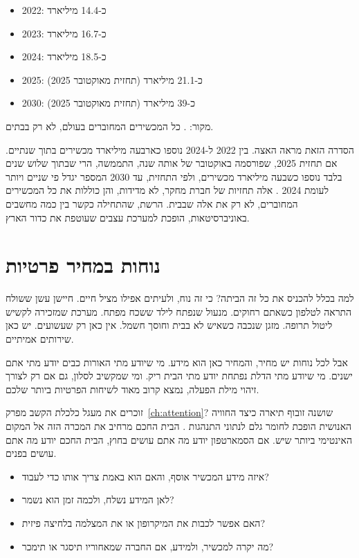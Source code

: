 \begin{factbox}
\begin{itemize}
  \item 2022: כ-14.4 מיליארד
  \item 2023: כ-16.7 מיליארד
  \item 2024: כ-18.5 מיליארד
  \item 2025: כ-21.1 מיליארד (תחזית מאוקטובר \num{2025})
  \item 2030: כ-39 מיליארד (תחזית מאוקטובר \num{2025})
\end{itemize}
מקור: \textcite{iotanalytics2025}. כל המכשירים המחוברים בעולם, לא רק בבתים.
\end{factbox}

הסדרה הזאת מראה האצה. בין 2022 ל-2024 נוספו כארבעה מיליארד מכשירים בתוך שנתיים. אם תחזית \num{2025}, שפורסמה באוקטובר של אותה שנה, התממשה, הרי שבתוך שלוש שנים בלבד נוספו כשבעה מיליארד מכשירים, ולפי התחזית, עד 2030 המספר יגדל פי שניים ויותר לעומת 2024 \parencite{iotanalytics2025}. אלה תחזיות של חברת מחקר, לא מדידות, והן כוללות את כל המכשירים המחוברים, לא רק את אלה שבבית. הרשת, שהתחילה כקשר בין כמה מחשבים באוניברסיטאות, הופכת למערכת עצבים שעוטפת את כדור הארץ.

\section{נוחות במחיר פרטיות}

למה בכלל להכניס את כל זה הביתה? כי זה נוח, ולעיתים אפילו מציל חיים. חיישן עשן ששולח התראה לטלפון כשאתם רחוקים. מנעול שנפתח לילד ששכח מפתח. מערכת שמזכירה לקשיש ליטול תרופה. מזגן שנכבה כשאיש לא בבית וחוסך חשמל. אין כאן רק שעשועים. יש כאן שירותים אמיתיים.

אבל לכל נוחות יש מחיר, והמחיר כאן הוא מידע. מי שיודע מתי האורות כבים יודע מתי אתם ישנים. מי שיודע מתי הדלת נפתחת יודע מתי הבית ריק. ומי שמקשיב לסלון, גם אם רק לצורך זיהוי מילת הפעלה, נמצא קרוב מאוד לשיחות הפרטיות ביותר שלכם.

זוכרים את מעגל כלכלת הקשב מפרק~\ref{ch:attention}? שושנה זובוף תיארה כיצד החוויה האנושית הופכת לחומר גלם לנתוני התנהגות \parencite{zuboff2019}. הבית החכם מרחיב את המכרה הזה אל המקום האינטימי ביותר שיש. אם הסמארטפון יודע מה אתם עושים בחוץ, הבית החכם יודע מה אתם עושים בפנים.

\begin{alertbox}
\begin{itemize}
  \item איזה מידע המכשיר אוסף, והאם הוא באמת צריך אותו כדי לעבוד?
  \item לאן המידע נשלח, ולכמה זמן הוא נשמר?
  \item האם אפשר לכבות את המיקרופון או את המצלמה בלחיצה פיזית?
  \item מה יקרה למכשיר, ולמידע, אם החברה שמאחוריו תיסגר או תימכר?
\end{itemize}
\end{alertbox}

